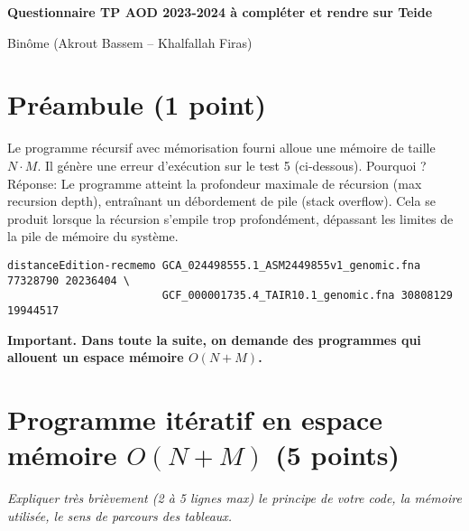 \documentclass[10pt,a4paper]{article}
\begin{document}
\thispagestyle{empty}

\noindent\centerline{\bf\large Questionnaire TP AOD 2023-2024 à compléter et rendre sur Teide}
Binôme (Akrout Bassem -- Khalfallah Firas)

\section{Préambule (1 point)}
Le programme récursif avec mémorisation fourni alloue une mémoire de taille $N \cdot M$. Il génère une erreur d'exécution sur le test 5 (ci-dessous). Pourquoi ?
Réponse: Le programme atteint la profondeur maximale de récursion (max recursion depth), entraînant un débordement de pile (stack overflow). Cela se produit lorsque la récursion s'empile trop profondément, dépassant les limites de la pile de mémoire du système.
\begin{verbatim}
distanceEdition-recmemo GCA_024498555.1_ASM2449855v1_genomic.fna 77328790 20236404 \
                        GCF_000001735.4_TAIR10.1_genomic.fna 30808129 19944517
\end{verbatim}

{\noindent\bf{Important.} Dans toute la suite, on demande des programmes qui allouent un espace mémoire $O(N+M)$.}

\section{Programme itératif en espace mémoire $O(N+M)$ (5 points)}
{\em Expliquer très brièvement (2 à 5 lignes max) le principe de votre code, la mémoire utilisée, le sens de parcours des tableaux.}
\end{document}

